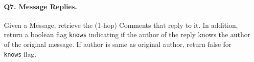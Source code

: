 \paragraph{\textbf{Q7}. Message Replies.}
Given a Message, retrieve the (1-hop) Comments that reply to it.
In addition, return a boolean flag \texttt{knows} indicating if the
author of the reply knows the author of the original message. If author
is same as original author, return false for \texttt{knows} flag.
